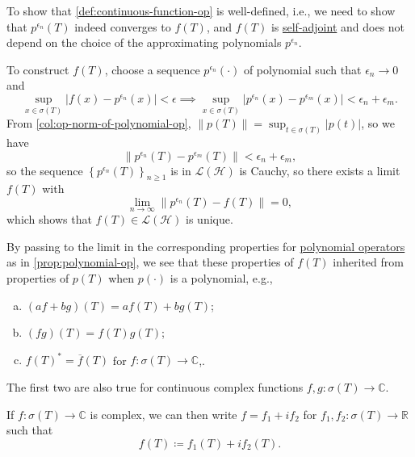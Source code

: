 \begin{note}
	To show that \autoref{def:continuous-function-op} is well-defined, i.e., we need to show that \(p^{\epsilon _n}(T)\) indeed converges to \(f(T)\), and \(f(T)\) is \hyperref[def:self-adjoint-op]{self-adjoint} and does not depend on the choice of the approximating polynomials \(p^{\epsilon _n}\).
\end{note}
\begin{explanation}
	To construct \(f(T)\), choose a sequence \(p^{\epsilon _n}(\cdot)\) of polynomial such that \(\epsilon _n \to 0\) and
	\[
		\sup _{x\in \sigma (T)} \vert f(x) - p^{\epsilon _n}(x)  \vert < \epsilon
		\implies \sup _{x\in \sigma (T)} \vert p^{\epsilon _n}(x) - p^{\epsilon _m}(x) \vert < \epsilon _n + \epsilon _m.
	\]
	From \autoref{col:op-norm-of-polynomial-op}, \(\lVert p(T) \rVert = \sup _{t\in \sigma (T)} \vert p(t) \vert \), so we have
	\[
		\lVert p^{\epsilon _n}(T) - p^{\epsilon _m}(T) \rVert < \epsilon _n + \epsilon _m,
	\]
	so the sequence \(\left\{ p^{\epsilon _n}(T) \right\} _{n\geq 1}\) is in \(\mathcal{L} (\mathcal{H} )\) is Cauchy, so there exists a limit \(f(T)\) with
	\[
		\lim_{n \to \infty} \lVert p^{\epsilon _n}(T) - f(T) \rVert = 0,
	\]
	which shows that \(f(T)\in \mathcal{L} (\mathcal{H} )\) is unique.
\end{explanation}

By passing to the limit in the corresponding properties for \hyperref[def:polynomial-op]{polynomial operators} as in \autoref{prop:polynomial-op}, we see that these properties of \(f(T)\) inherited from properties of \(p(T)\) when \(p(\cdot)\) is a polynomial, e.g.,
\begin{enumerate}[(a)]
	\item \((af + bg)(T) = af(T) + bg(T)\);
	\item \((fg)(T) = f(T) g(T)\);
	\item \(f(T)^{\ast} = \overline{f} (T)\) for \(f\colon \sigma (T) \to \mathbb{C}\),.
\end{enumerate}

\begin{note}
	The first two are also true for continuous complex functions \(f, g\colon \sigma (T) \to \mathbb{C} \).
\end{note}
\begin{explanation}
	If \(f\colon \sigma (T) \to  \mathbb{C} \) is complex, we can then write \(f = f_1 + if_2\) for \(f_1, f_2 \colon \sigma (T) \to \mathbb{R} \) such that
	\[
		f(T) \coloneqq f_1(T) + if_2(T).
	\]
\end{explanation}

